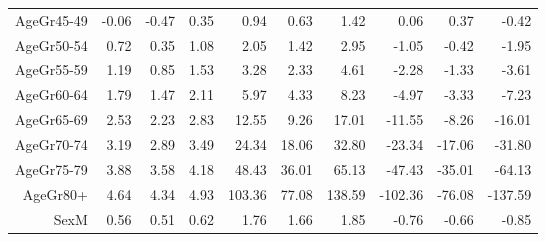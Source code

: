 \begin{table}[ht]
\begin{tabular}{rrrrrrrrrr}
  AgeGr45-49 & -0.06 & -0.47 & 0.35 & 0.94 & 0.63 & 1.42 & 0.06 & 0.37 & -0.42 \\ 
  AgeGr50-54 & 0.72 & 0.35 & 1.08 & 2.05 & 1.42 & 2.95 & -1.05 & -0.42 & -1.95 \\ 
  AgeGr55-59 & 1.19 & 0.85 & 1.53 & 3.28 & 2.33 & 4.61 & -2.28 & -1.33 & -3.61 \\ 
  AgeGr60-64 & 1.79 & 1.47 & 2.11 & 5.97 & 4.33 & 8.23 & -4.97 & -3.33 & -7.23 \\ 
  AgeGr65-69 & 2.53 & 2.23 & 2.83 & 12.55 & 9.26 & 17.01 & -11.55 & -8.26 & -16.01 \\ 
  AgeGr70-74 & 3.19 & 2.89 & 3.49 & 24.34 & 18.06 & 32.80 & -23.34 & -17.06 & -31.80 \\ 
  AgeGr75-79 & 3.88 & 3.58 & 4.18 & 48.43 & 36.01 & 65.13 & -47.43 & -35.01 & -64.13 \\ 
  AgeGr80+ & 4.64 & 4.34 & 4.93 & 103.36 & 77.08 & 138.59 & -102.36 & -76.08 & -137.59 \\ 
  SexM & 0.56 & 0.51 & 0.62 & 1.76 & 1.66 & 1.85 & -0.76 & -0.66 & -0.85 \\ 
   \hline
\end{tabular}
\end{table}
